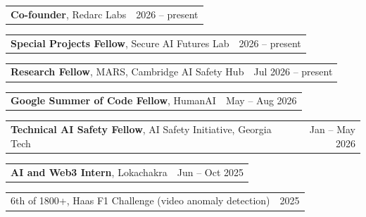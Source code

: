 \documentclass[letterpaper,11pt]{article}
\makeatletter
\newcommand{\sect}[1]{\vspace{13pt}{\scshape\large #1}\par\vspace{5pt}}
\newcommand{\row}[2]{\begin{tabularx}{\textwidth}{@{}>{\raggedright\arraybackslash}X@{\hspace{10pt}}r@{}}#1 & #2\end{tabularx}\par}
\makeatother
\begin{document}
\vspace{-7pt}
\sect{Experience}
\row{\textbf{Co-founder}, Redarc Labs}{2026 -- present}\vspace{2pt}
\row{\textbf{Special Projects Fellow}, Secure AI Futures Lab}{2026 -- present}\vspace{2pt}
\row{\textbf{Research Fellow}, MARS, Cambridge AI Safety Hub}{Jul 2026 -- present}\vspace{2pt}
\row{\textbf{Google Summer of Code Fellow}, HumanAI}{May -- Aug 2026}\vspace{2pt}
\row{\textbf{Technical AI Safety Fellow}, AI Safety Initiative, Georgia Tech}{Jan -- May 2026}\vspace{2pt}
\row{\textbf{AI and Web3 Intern}, Lokachakra}{Jun -- Oct 2025}

\sect{Awards}
\row{6th of 1800+, Haas F1 Challenge (video anomaly detection)}{2025}
\end{document}
